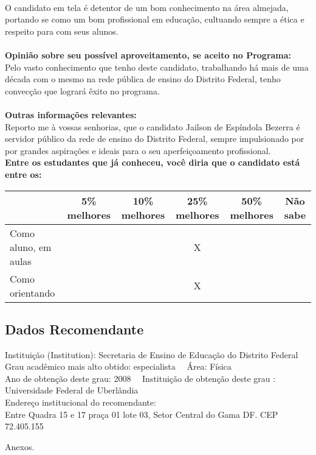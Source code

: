 \documentclass[11pt]{article}
\begin{document}
\\O candidato em tela é detentor de um bom conhecimento na área almejada, portando se como um bom profissional em educação, cultuando sempre a ética e respeito para com seus alunos.\\
\\
\textbf{Opinião sobre seu possível aproveitamento, se aceito no Programa:}
\\Pelo vasto conhecimento que tenho deste candidato, trabalhando há mais de uma década com o mesmo na rede pública de ensino do Distrito Federal, tenho convecção que logrará êxito no programa.\\ 
\\
\textbf{Outras informações relevantes:} \\Reporto me à vossas senhorias, que o candidato Jailson de Espíndola Bezerra é servidor público da rede de ensino do Distrito Federal, sempre impulsionado por por grandes aspirações e ideais para o seu aperfeiçoamento profissional.  
\\[0.3cm]
\textbf{Entre os estudantes que já conheceu, você diria que o candidato está entre os:}
\\
\begin{tabular}{|l|c|c|c|c|c|}
\hline
 & 5\% melhores & 10\% melhores & 25\% melhores & 50\% melhores & Não sabe \\
\hline
Como aluno, em aulas &  &  & X &  & \\
\hline
Como orientando &  &  & X &  & \\
\hline
\end{tabular}
\subsection*{Dados Recomendante} 
	Instituição (Institution): Secretaria de Ensino de Educação do Distrito Federal
\\ 
	Grau acadêmico mais alto obtido: especialista
	\ \ Área: Física
	\\
	Ano de obtenção deste grau: 2008
	\ \ 
	Instituição de obtenção deste grau : Universidade Federal de Uberlândia 
	\\ 
	Endereço institucional do recomendante: \\ Entre Quadra 15 e 17 praça 01 lote 03, Setor Central do Gama  DF. CEP 72.405.155 
\begin{center}
Anexos.
\end{center}
\end{document}

